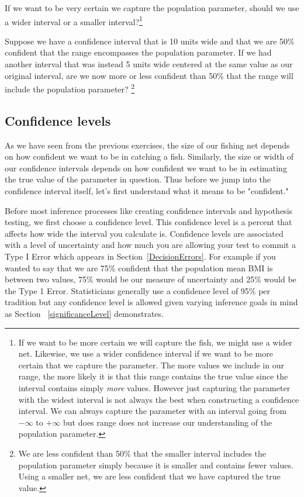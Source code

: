 \begin{exercise}
If we want to be very certain we capture the population parameter, should we use a wider interval or a smaller interval?\footnote{If we want to be more certain we will capture the fish, we might use a wider net. Likewise, we use a wider confidence interval if we want to be more certain that we capture the parameter. The more values we include in our range, the more likely it is that this range contains the true value since the interval contains simply \emph{more} values. However just capturing the parameter with the widest interval is not always the best when constructing a confidence interval. We can always capture the parameter with an interval going from $-\infty$ to $+\infty$ but does range does not increase our understanding of the population parameter.}
\end{exercise}
\begin{exercise}
Suppose we have a confidence interval that is 10 units wide and that we are 50\% confident that the range encompasses the population parameter. If we had another interval that was instead 5 units wide centered at the same value as our original interval, are we now more or less confident than 50\% that the range will include the population parameter? \footnote{We are less confident than 50\% that the smaller interval includes the population parameter simply because it is smaller and contains fewer values. Using a smaller net, we are less confident that we have captured the true value.}
\end{exercise}

\subsection{Confidence levels}

As we have seen from the previous exercises, the size of our fishing net depends on how confident we want to be in catching a fish. Similarly, the size or width of our confidence intervals depends on how confident we want to be in estimating the true value of the parameter in question. Thus before we jump into the confidence interval itself, let's first understand what it means to be "confident." 

Before most inference processes like creating confidence intervals and hypothesis testing, we first choose a confidence level. This confidence level is a percent that affects how wide the interval you calculate is. Confidence levels are associated with a level of uncertainty and how much you are allowing your test to commit a Type I Error which appears in Section~\ref{DecisionErrors}. For example if you wanted to say that we are 75\% confident that the population mean BMI is between two values, 75\% would be our measure of uncertainty and 25\% would be the Type 1 Error. Statisticians generally use a confidence level of 95\% per tradition but any confidence level is allowed given varying inference goals in mind as Section ~\ref{significanceLevel} demonstrates. 


